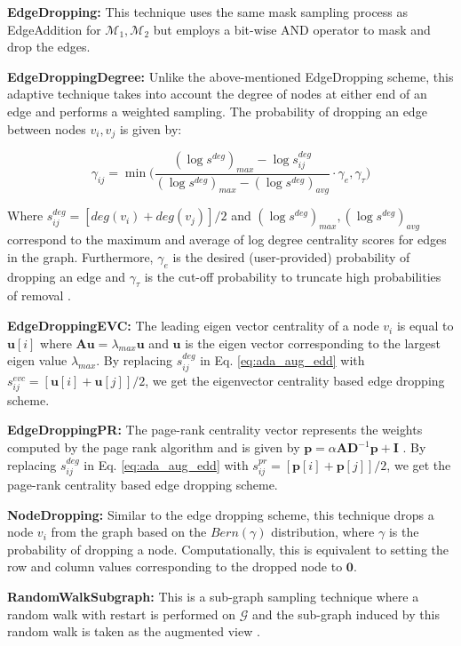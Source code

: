 \documentclass{article}
\def\mA{{\mathbf{A}}}
\def\mD{{\mathbf{D}}}
\def\mI{{\mathbf{I}}}
\def\vzero{{\mathbf{0}}}
\def\vp{{\mathbf{p}}}
\def\vu{{\mathbf{u}}}
\def\gG{{\mathcal{G}}}
\theoremstyle{plain}
\theoremstyle{definition}
\theoremstyle{remark}
\begin{document}
\textbf{EdgeDropping:} This technique uses the same mask sampling process as EdgeAddition for $\mathcal{M}_1, \mathcal{M}_2$ but employs a bit-wise AND operator to mask and drop the edges. 

\textbf{EdgeDroppingDegree:} Unlike the above-mentioned EdgeDropping scheme, this adaptive technique takes into account the degree of nodes at either end of an edge and performs a weighted sampling. The probability of dropping an edge between nodes $v_i, v_j$ is given by:

\begin{equation}
\label{eq:ada_aug_edd}
\gamma_{ij} = \min \bigg ( \frac{(\log s^{deg})_{max} - \log s^{deg}_{ij} }{(\log s^{deg})_{max} - (\log s^{deg})_{avg}} \cdot \gamma_e , \gamma_{\tau} \bigg)
\end{equation}

Where $s^{deg}_{ij} = [deg(v_i) + deg(v_j)]/2$ and $(\log s^{deg})_{max}, (\log s^{deg})_{avg}$ correspond to the maximum and average of log degree centrality scores for edges in the graph. Furthermore, $\gamma_e$ is the desired (user-provided) probability of dropping an edge and $\gamma_{\tau}$ is the cut-off probability to truncate high probabilities of removal \citep{zhu2021graph}.

\textbf{EdgeDroppingEVC:} The leading eigen vector centrality of a node $v_i$ is equal to $\vu[i]$ where $\mA\vu = \lambda_{max} \vu$ and $\vu$ is the eigen vector corresponding to the largest eigen value $\lambda_{max}$. By replacing $s^{deg}_{ij}$ in Eq. \ref{eq:ada_aug_edd} with $s^{evc}_{ij} = [\vu[i] + \vu[j]]/2$, we get the eigenvector centrality based edge dropping scheme.

\textbf{EdgeDroppingPR:} The page-rank centrality vector represents the weights computed by the page rank algorithm \citep{page1999pagerank} and is given by $\vp = \alpha \mA \mD^{-1}\vp + \mI$ \citep{zhu2021graph}. By replacing $s^{deg}_{ij}$ in Eq. \ref{eq:ada_aug_edd} with $s^{pr}_{ij} = [\vp[i] + \vp[j]]/2$, we get the page-rank centrality based edge dropping scheme.

\textbf{NodeDropping:} Similar to the edge dropping scheme, this technique drops a node $v_i$ from the graph based on the $Bern(\gamma)$ distribution, where $\gamma$ is the probability of dropping a node. Computationally, this is equivalent to setting the row and column values corresponding to the dropped node to $\vzero$.

\textbf{RandomWalkSubgraph:} This is a sub-graph sampling technique where a random walk with restart is performed on $\gG$ and the sub-graph induced by this random walk is taken as the augmented view \citep{zhu2021empirical}.
\end{document}
